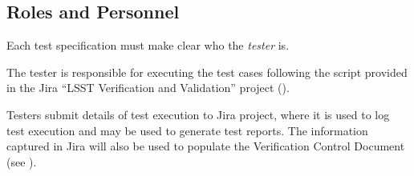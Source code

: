 





\subsection{Roles and Personnel}
\label{sect:roles}

Each test specification must make clear who the \emph{tester} is.

The tester is responsible for executing the test cases following the script provided in the Jira ``LSST Verification and Validation'' project ().

Testers submit details of test execution to Jira project, where it is used to log test execution and may be used to generate test reports.
The information captured in Jira will also be used to populate the Verification Control Document (see ).

